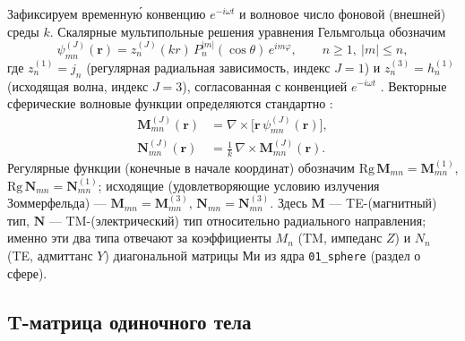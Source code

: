 \documentclass[11pt,a4paper]{article}
\begin{document}
Зафиксируем временну\'ю конвенцию $e^{-i\omega t}$ и волновое число фоновой (внешней) среды $k$. Скалярные мультипольные решения уравнения Гельмгольца обозначим
\begin{equation}
\psi_{mn}^{(J)}(\bm{r}) = z_n^{(J)}(kr)\, P_n^{|m|}(\cos\theta)\, e^{i m \varphi},
\qquad n\ge 1,\ |m|\le n,
\label{tmatrix-eq:tm-scalar}
\end{equation}
где $z_n^{(1)}=j_n$ (регулярная радиальная зависимость, индекс $J{=}1$) и $z_n^{(3)}=h_n^{(1)}$ (исходящая волна, индекс $J{=}3$), согласованная с конвенцией $e^{-i\omega t}$ \cite{stratton1941,bohren1983}. Векторные сферические волновые функции определяются стандартно \cite{stratton1941,mishchenko2002}:
\begin{align}
\bm{M}_{mn}^{(J)}(\bm{r}) &= \nabla\times\bigl[\bm{r}\,\psi_{mn}^{(J)}(\bm{r})\bigr],
\label{tmatrix-eq:tm-M}\\
\bm{N}_{mn}^{(J)}(\bm{r}) &= \frac{1}{k}\,\nabla\times\bm{M}_{mn}^{(J)}(\bm{r}).
\label{tmatrix-eq:tm-N}
\end{align}
Регулярные функции (конечные в начале координат) обозначим $\mathrm{Rg}\,\bm{M}_{mn}=\bm{M}_{mn}^{(1)}$, $\mathrm{Rg}\,\bm{N}_{mn}=\bm{N}_{mn}^{(1)}$; исходящие (удовлетворяющие условию излучения Зоммерфельда) --- $\bm{M}_{mn}=\bm{M}_{mn}^{(3)}$, $\bm{N}_{mn}=\bm{N}_{mn}^{(3)}$. Здесь $\bm{M}$ --- TE-(магнитный) тип, $\bm{N}$ --- TM-(электрический) тип относительно радиального направления; именно эти два типа отвечают за коэффициенты $M_n$ (TM, импеданс $Z$) и $N_n$ (TE, адмиттанс $Y$) диагональной матрицы Ми из ядра \texttt{01\_sphere} (раздел о сфере).

\subsection{T-матрица одиночного тела}
\label{tmatrix-sec:tm-single}
\end{document}
